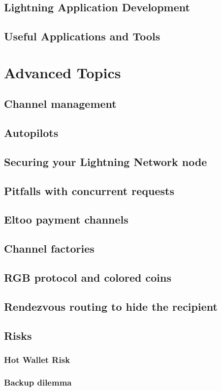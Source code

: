 \documentclass[ebook,12pt,oneside,openany]{memoir}
\begin{document}
\section{Lightning Application Development}
\section{Useful Applications and Tools}
\chapter{Advanced Topics}
\section{Channel management}
\section{Autopilots}
\section{Securing your Lightning Network node}
\section{Pitfalls with concurrent requests}
\section{Eltoo payment channels}
\section{Channel factories}
\section{RGB protocol and colored coins}
\section{Rendezvous routing to hide the recipient}
\section{Risks}
\subsection{Hot Wallet Risk}
\subsection{Backup dilemma}
\end{document}
